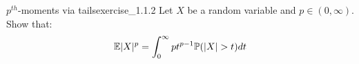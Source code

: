 \begin{exercise}{$p^{th}$-moments via tails}{exercise_1.1.2}
    Let $X$ be a random variable and $p\in(0,\infty)$. Show that:
    \begin{align}
        \mathbb{E}|X|^p = \int_0^\infty pt^{p-1}\mathbb{P}(|X| > t)dt
    \end{align}
\end{exercise}

\begin{solution*}
    
\end{solution*}

